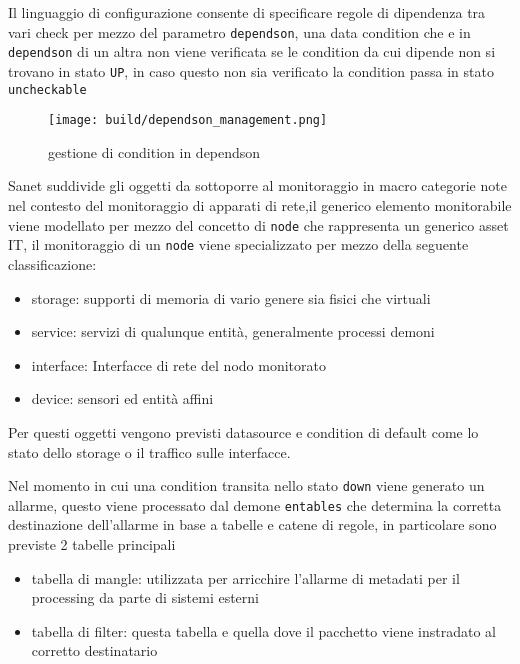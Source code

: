 Il linguaggio di configurazione consente di specificare regole di dipendenza tra vari check per mezzo del parametro \verb|dependson|, una data condition che e in \verb|dependson| di un altra non viene verificata se le condition da cui dipende non si trovano in stato \verb|UP|, in caso questo non sia verificato la condition passa in stato \verb|uncheckable|

\begin{figure}[H]
    \centering
    \texttt{[image: build/dependson\_management.png]}
    \caption{gestione di condition in dependson}
    \label{fig:enter-label}
\end{figure}

Sanet suddivide gli oggetti da sottoporre al monitoraggio in macro categorie note nel contesto del monitoraggio di apparati di rete,il generico elemento monitorabile viene modellato per mezzo del concetto di \verb|node| che rappresenta un generico asset IT, il monitoraggio di un \verb|node| viene specializzato per mezzo della seguente classificazione:

\begin{itemize}
  \item storage: supporti di memoria di vario genere sia fisici che virtuali
  \item service: servizi di qualunque entità, generalmente processi demoni
  \item interface: Interfacce di rete del nodo monitorato
  \item device: sensori ed entità affini
\end{itemize}

Per questi oggetti vengono previsti datasource e condition di default come lo stato dello storage o il traffico sulle interfacce.

Nel momento in cui una condition transita nello stato \verb|down| viene generato un allarme, questo viene processato dal demone \verb|entables| che determina la corretta destinazione dell'allarme in base a tabelle e catene di regole, in particolare sono previste 2 tabelle principali

\begin{itemize}
  \item tabella di mangle: utilizzata per arricchire l'allarme di metadati per il processing da parte di sistemi esterni
  \item tabella di filter: questa tabella e quella dove il pacchetto viene instradato al corretto destinatario
\end{itemize}


